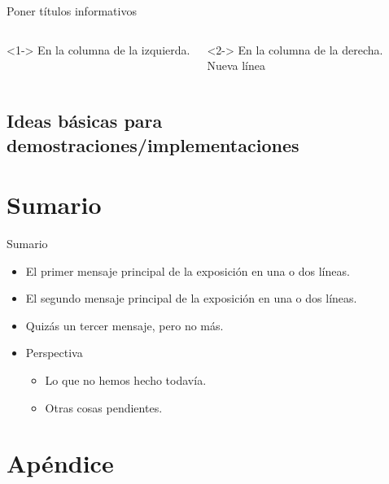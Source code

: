 \documentclass[]{beamer}
\theoremstyle{plain}
\begin{document}
\begin{frame}{Poner títulos informativos }

\begin{columns}[t]


\column{5cm}
\begin{theorem}<1->
En la columna de la izquierda.
\end{theorem}


\column{5cm}
\begin{corollary}<2->
En la columna de la derecha.\\
Nueva línea
\end{corollary}

\end{columns}

\end{frame}

\subsection{Ideas básicas para demostraciones/implementaciones}


\section*{Sumario}
\begin{frame}{Sumario}

\begin{itemize}
\item El \alert{primer mensaje principal }de la exposición en una o dos
líneas.
\item El \alert{segundo mensaje principal} de la exposición en una o dos
líneas.
\item Quizás un \alert{tercer mensaje}, pero no más.
\end{itemize}




\medskip{}

\begin{itemize}
\item Perspectiva

\begin{itemize}
\item Lo que no hemos hecho todavía.
\item Otras cosas pendientes.
\end{itemize}
\end{itemize}
\end{frame}
\appendix

\section*{Apéndice}
\end{document}
